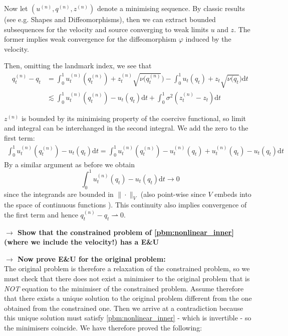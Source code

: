 \documentclass{article}
\newcommand{\norm}[2]{\| #1 \|_{ #2 }}
\newcommand{\vnorm}[1]{\norm{ #1 }{V}}
\newcommand{\diff}[1]{\text{d} #1}
\begin{document}
Now let $(u^{(n)}, q^{(n)}, z^{(n)})$ denote a
minimising sequence. By classic results (see e.g.  Shapes and Diffeomorphisms),
then we can extract bounded subsequences for the velocity and source converging
to weak limits $u$ and $z$. The former implies weak
convergence for the diffeomorphism $\varphi$ induced by the velocity. 

Then, omitting the landmark index, we see that\\
\begin{align*}
q_t^{(n)} - q_t & = 
\int_0^1u_t^{(n)}(q_t^{(n)})+z_t^{(n)}\sqrt{\nu(q_t^{(n)}}) 
-\int_0^1u_t(q_t)+z_t\sqrt{\nu(q_t})  \diff{t}\\
&\lesssim \int_0^1 u_t^{(n)}(q_t^{(n)}) -  u_t(q_t)\diff{t}+ \int_0^1 \sigma^2 \left(z_t^{(n)} - z_t \right) \diff{t}
\end{align*}

$z^{(n)}$ is bounded by its minimising property of the coercive functional, so
limit and integral can be interchanged in the second integral. We add the zero
to the first term:
\begin{align*}
\int_0^1 u_t^{(n)}(q_t^{(n)}) -  u_t(q_t)\diff{t} = 
\int_0^1 u_t^{(n)}(q_t^{(n)}) - u_t^{(n)}(q_t) + u_t^{(n)}(q_t) - u_t(q_t)\diff{t}
\end{align*}
By a similar argument as before we obtain 
\[
\int_0^1 u_t^{(n)}(q_t) - u_t(q_t)\diff{t} \rightarrow 0
\]
since the integrands are bounded in $\vnorm{\cdot}$ (also point-wise since $V$
embeds into the space of continuous functions \cite{something}). This continuity
also implies convergence of the first term and hence $q_t^{(n)} -
q_t\rightharpoonup 0$.

\textbf{$\longrightarrow$ Show that the constrained problem of
\eqref{pbm:nonlinear_inner} (where we include the velocity!) has a E\&U}

\textbf{$\longrightarrow$ Now prove E\&U for the original problem:}\\

The original problem is therefore a relaxation of the constrained problem, so we
must check that there does not exist a minimiser to the original problem that is
\emph{NOT} equation to the minimiser of the constrained problem. Assume
therefore that there exists a unique solution to the original problem different
from the one obtained from the constrained one. Then we arrive at a
contradiction because this unique solution must satisfy
\eqref{pbm:nonlinear_inner} - which is invertible - so the minimisers coincide.
We have therefore proved the following:
\end{document}
